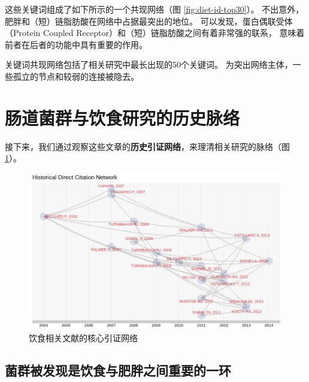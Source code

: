 \documentclass[]{ctexbook}
\begin{document}
这些关键词组成了如下所示的一个共现网络（图 \ref{fig:diet-id-top30}）。
不出意外，肥胖和（短）链脂肪酸在网络中占据最突出的地位。
可以发现，蛋白偶联受体（Protein Coupled Receptor）和（短）链脂肪酸之间有着非常强的联系，
意味着前者在后者的功能中具有重要的作用。

\hypertarget{htmlwidget-d8bf19b04221ff07d99b}{}

\label{fig:diet-id-network}关键词共现网络包括了相关研究中最长出现的50个关键词。
为突出网络主体，一些孤立的节点和较弱的连接被隐去。

\hypertarget{ux80a0ux9053ux83ccux7fa4ux4e0eux996eux98dfux7814ux7a76ux7684ux5386ux53f2ux8109ux7edc}{%
\section{肠道菌群与饮食研究的历史脉络}\label{ux80a0ux9053ux83ccux7fa4ux4e0eux996eux98dfux7814ux7a76ux7684ux5386ux53f2ux8109ux7edc}}

接下来，我们通过观察这些文章的\textbf{历史引证网络}，来理清相关研究的脉络（图 \ref{fig:diet-article-histnet}）。

\begin{figure}
\includegraphics[width=1\linewidth]{plots/diet-article-histnet-1} \caption{饮食相关文献的核心引证网络}\label{fig:diet-article-histnet}
\end{figure}

\hypertarget{ux83ccux7fa4ux88abux53d1ux73b0ux662fux996eux98dfux4e0eux80a5ux80d6ux4e4bux95f4ux91cdux8981ux7684ux4e00ux73af}{%
\subsection{菌群被发现是饮食与肥胖之间重要的一环}\label{ux83ccux7fa4ux88abux53d1ux73b0ux662fux996eux98dfux4e0eux80a5ux80d6ux4e4bux95f4ux91cdux8981ux7684ux4e00ux73af}}
\end{document}
